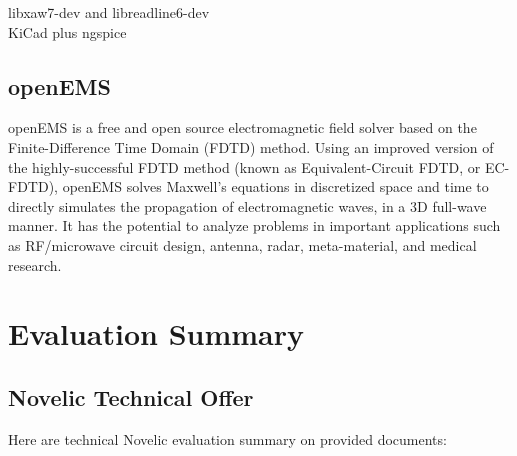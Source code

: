 \documentclass{article}
\begin{document}
libxaw7-dev and libreadline6-dev
\\
KiCad plus ngspice




\subsection{openEMS}

openEMS is a free and open source electromagnetic field solver based on the Finite-Difference Time Domain (FDTD) method. Using an improved version of the highly-successful FDTD method (known as Equivalent-Circuit FDTD, or EC-FDTD), openEMS solves Maxwell's equations in discretized space and time to directly simulates the propagation of electromagnetic waves, in a 3D full-wave manner. It has the potential to analyze problems in important applications such as RF/microwave circuit design, antenna, radar, meta-material, and medical research.


\newpage


\section{Evaluation Summary}


\subsection{Novelic Technical Offer}

Here are technical Novelic evaluation summary on provided documents:  %
\end{document}
